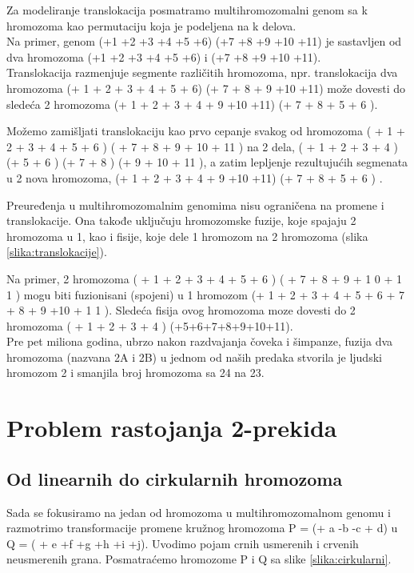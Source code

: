 Za modeliranje translokacija posmatramo multihromozomalni genom sa k hromozoma
kao permutaciju koja je podeljena na k delova.\\

Na primer, genom
(+1 +2 +3 +4 +5 +6) (+7 +8 +9 +10 +11) je sastavljen od dva hromozoma (+1
+2 +3 +4 +5 +6) i (+7 +8 +9 +10 +11). \\

Translokacija razmenjuje segmente različitih hromozoma, npr. translokacija dva hromozoma
(+ 1 + 2 + 3 + 4 + 5 + 6) (+ 7 + 8 + 9 +10 +11) može dovesti do sledeća 2 hromozoma
(+ 1 + 2 + 3 + 4 + 9 +10 +11) (+ 7 + 8 + 5 + 6 ).

Možemo zamišljati translokaciju kao prvo cepanje svakog od hromozoma
( + 1 + 2 + 3 + 4 + 5 + 6 ) ( + 7 + 8 + 9 + 10 + 11 ) na 2 dela,
( + 1 + 2 + 3 + 4 ) (+ 5 + 6 ) (+ 7 + 8 ) (+ 9 + 10 + 11 ), a zatim lepljenje rezultujućih segmenata u 2 nova hromozoma, (+ 1 + 2 + 3 + 4 + 9 +10 +11) (+ 7 + 8 + 5 + 6 ) .

Preuređenja u multihromozomalnim genomima nisu ograničena na promene i translokacije. Ona takođe uključuju hromozomske fuzije, koje spajaju 2 hromozoma u 1, kao i fisije, koje dele 1 hromozom na 2 hromozoma (slika \ref{slika:translokacije}).

Na primer, 2 hromozoma
( + 1 + 2 + 3 + 4 + 5 + 6 ) ( + 7 + 8 + 9 + 1 0 + 1 1 ) mogu biti fuzionisani (spojeni) u 1 hromozom (+ 1 + 2 + 3 + 4 + 5 + 6 + 7 + 8 + 9 +10 + 1 1 ).
Sledeća fisija ovog hromozoma moze dovesti do 2 hromozoma ( + 1 + 2 + 3 + 4 ) (+5+6+7+8+9+10+11).\\

Pre pet miliona godina, ubrzo nakon razdvajanja čoveka i šimpanze, fuzija
dva hromozoma (nazvana 2A i 2B) u jednom od naših predaka stvorila je ljudski hromozom 2 i smanjila broj hromozoma sa 24 na 23.


\section{Problem rastojanja 2-prekida}

\subsection{Od linearnih do cirkularnih hromozoma}

\indent Sada se fokusiramo na jedan od hromozoma u multihromozomalnom genomu i razmotrimo transformacije promene kružnog hromozoma P = (+ a -b -c + d) u Q = ( + e +f +g +h +i +j). Uvodimo pojam crnih usmerenih i crvenih neusmerenih grana. Posmatraćemo hromozome P i Q sa slike \ref{slika:cirkularni}.

